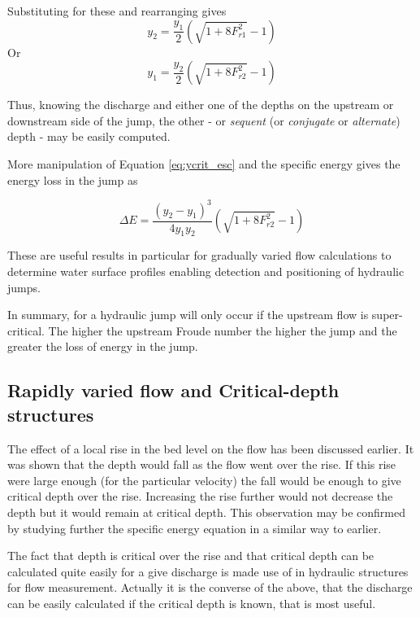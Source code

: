 \documentclass[a4paper, 12pt, british]{article} %
\numberwithin{equation}{section}
\numberwithin{figure}{section}
\numberwithin{table}{section}
\begin{document}
Substituting for these and rearranging gives
 \begin{equation}
y_2  = \frac{y_1}{2} \left(\sqrt{1+8F_{r1}^{2}}-1\right)
\label{eq:conj_y2_from_y1}
\end{equation}
Or
 \begin{equation}
y_1  = \frac{y_2}{2} \left(\sqrt{1+8F_{r2}^2}-1\right)
\label{eq:conj_y1_from_y2}
\end{equation}

Thus, knowing the discharge and either one of the depths on the upstream or downstream side of the jump, the other - or \textit{sequent} (or \textit{conjugate} or \textit{alternate}) depth - may be easily computed. 

More manipulation of  Equation \ref{eq:ycrit_esc} and the specific energy gives the energy loss in the jump as

 \begin{equation}
\Delta E  = \frac{(y_2-y_1)^3}{4y_1y_2} \left(\sqrt{1+8F_{r2}^2}-1\right)
\label{eq:deltaE}
\end{equation}

These are useful results in particular for gradually varied flow calculations to determine water surface profiles enabling detection and positioning of hydraulic jumps.

In summary, for a hydraulic jump will only occur if the upstream flow is super-critical. The higher the upstream Froude number the higher the jump and the greater the loss of energy in the jump.

\subsection{Rapidly varied flow and Critical-depth structures}
The effect of a local rise in the bed level on the flow has been discussed earlier. It was shown that the depth would fall as the flow went over the rise. If this rise were large enough (for the particular velocity) the fall would be enough to give critical depth over the rise. Increasing the rise further would not decrease the depth but it would remain at critical depth. This observation may be confirmed by studying further the specific energy equation in a similar way to earlier.

The fact that depth is critical over the rise and that critical depth can be calculated quite easily for a give discharge is made use of in hydraulic structures for flow measurement. Actually it is the converse of the above, that the discharge can be easily calculated if the critical depth is known, that is most useful.
\end{document}

